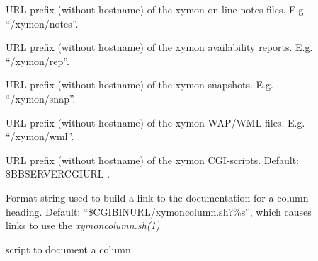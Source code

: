 \begin{description}
 

\item[] URL prefix (without hostname) of the xymon on-line notes files. E.g ``/xymon/notes''. 

 

\item[] URL prefix (without hostname) of the xymon availability reports. E.g. ``/xymon/rep''. 

 

\item[] URL prefix (without hostname) of the xymon snapshots. E.g. ``/xymon/snap''. 

 

\item[] URL prefix (without hostname) of the xymon WAP/WML files. E.g. ``/xymon/wml''. 

 

\item[] URL prefix (without hostname) of the xymon CGI-scripts. Default: \$BBSERVERCGIURL . 

 

\item[] Format string used to build a link to the
  documentation for a column heading. Default:
  ``\$CGIBINURL/xymoncolumn.sh?\%s'', which causes links to use the
  \emph{xymoncolumn.sh(1)}

 script to document a column. 

 


 


\end{description}
